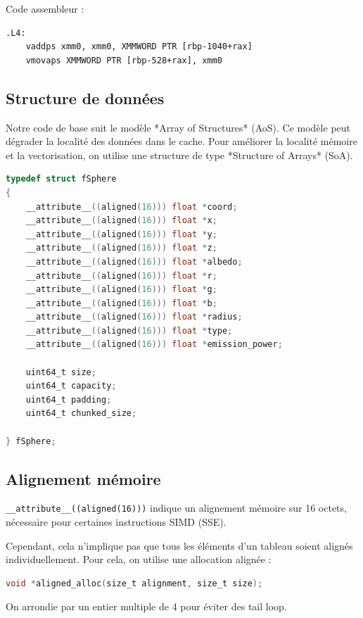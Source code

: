 Code assembleur :

\begin{lstlisting}
.L4:
    vaddps xmm0, xmm0, XMMWORD PTR [rbp-1040+rax]
    vmovaps XMMWORD PTR [rbp-528+rax], xmm0
\end{lstlisting}

\FloatBarrier

\subsection{Structure de données}

Notre code de base suit le modèle *Array of Structures* (AoS). Ce modèle peut dégrader la localité des données dans le cache.
Pour améliorer la localité mémoire et la vectorisation, on utilise une structure de type *Structure of Arrays* (SoA).

\begin{lstlisting}[language=C]
typedef struct fSphere
{
    __attribute__((aligned(16))) float *coord;
    __attribute__((aligned(16))) float *x;
    __attribute__((aligned(16))) float *y;
    __attribute__((aligned(16))) float *z;
    __attribute__((aligned(16))) float *albedo;
    __attribute__((aligned(16))) float *r;
    __attribute__((aligned(16))) float *g;
    __attribute__((aligned(16))) float *b;
    __attribute__((aligned(16))) float *radius;
    __attribute__((aligned(16))) float *type;
    __attribute__((aligned(16))) float *emission_power;

    uint64_t size;
    uint64_t capacity;
    uint64_t padding;
    uint64_t chunked_size;

} fSphere;
\end{lstlisting}

\subsection{Alignement mémoire}

\lstinline|__attribute__((aligned(16)))| indique un alignement mémoire sur 16 octets, nécessaire pour certaines instructions SIMD (SSE).

Cependant, cela n'implique pas que tous les éléments d'un tableau soient alignés individuellement. Pour cela, on utilise une allocation alignée :

\begin{lstlisting}[language=C]
void *aligned_alloc(size_t alignment, size_t size);
\end{lstlisting}
On arrondie par un entier multiple de 4 pour éviter des tail loop.

